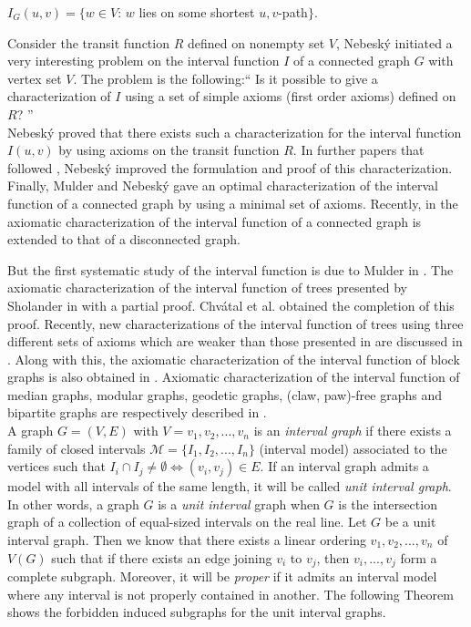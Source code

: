 \documentclass[10pt,a4paper]{article}
\begin{document}
\begin{center}
$I_G(u,v)=\{w\in V$: $w$ lies on some shortest $u,v$-path$\}$.
\end{center}




Consider the transit function $R$ defined on nonempty  set $V$, Nebesk\'{y} initiated a very interesting problem on the interval function $I$ of a connected graph $G$ with vertex set $V$. The problem is the following:`` Is it possible to give a characterization of $I$ using a set of simple axioms (first order axioms) defined on $R$? ''\\

Nebesk\'{y} \cite{nebesky-94,nebe-94} proved that there exists such a characterization for the interval function $I(u,v)$ by using axioms on the transit function $R$. In  further papers that followed \cite{nebe-95,ne-08,nebesky-08,nebe-01}, Nebesk\'{y} improved the formulation and proof of this characterization. Finally, Mulder and Nebesk\'{y} \cite{mune-09} gave an optimal characterization of the interval function of a connected graph by using a minimal set of axioms. Recently, in \cite{chfermuna-18} the axiomatic characterization of the interval function
of a connected graph is extended to that of a disconnected graph. 

But the first systematic study of the interval function is due to Mulder in \cite{mu-80}. The axiomatic characterization of the interval function of trees presented by Sholander in \cite{Sholander-52} with a partial proof. Chv\'{a}tal et al. \cite{Chvatal-11} obtained the completion of this proof. Recently, new characterizations of the interval function of trees using three different sets of axioms which are weaker than those presented in \cite{Chvatal-11,Sholander-52} are discussed in \cite{kaMc-01}. Along with this, the axiomatic characterization of the interval function of block graphs is also obtained in \cite{kaMc-01}. Axiomatic characterization of the interval function of median graphs, modular graphs, geodetic graphs, (claw, paw)-free graphs and bipartite graphs are respectively described in \cite{mu-80,mune-09,nebe-95,chferna-16, mfn}. \\



A graph $G = (V, E)$ with $V = v_{1}, v_{2}, ..., v_{n} $ is an \emph{interval graph}
if there exists a family of closed intervals $\mathcal{M}= \{I_{1}, I_{2}, ..., I_{n}\}$
(interval model) associated to the vertices such that
$I_{i} \cap I_{j} \neq\emptyset \Leftrightarrow (v_{i} , v_{j} ) \in E$. If an interval graph admits a model with all intervals of the same length, it will be called \emph{unit interval graph}. In other words, a graph $G$ is a \emph{unit interval} graph when $G$ is the intersection graph of a collection of equal-sized intervals on the real line. Let $G$ be a unit interval graph. Then we know that there exists a linear ordering $v_{1}, v_{2}, ... , v_{n}$ of $V(G)$ such that if there
exists an edge joining $v_{i}$ to $v_{j}$, then $v_{i}, ... , v_{j}$ form a complete subgraph. Moreover, it will be \emph{proper} if it admits an interval model where any interval is not properly contained in another. The following Theorem shows the forbidden induced subgraphs for the unit interval graphs.
\end{document}
